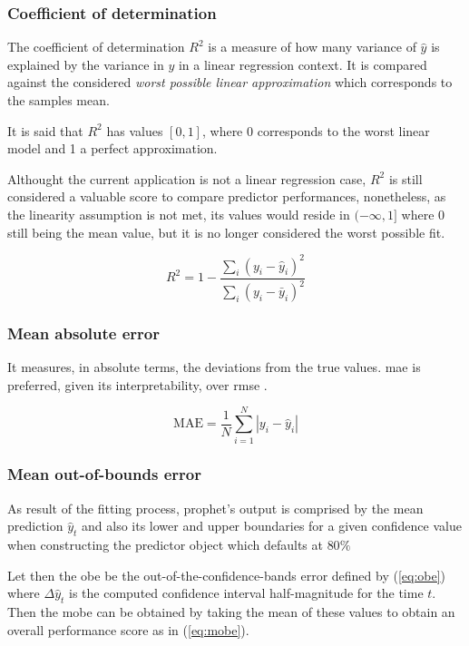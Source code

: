 \subsubsection*{Coefficient of determination}

The coefficient of determination $R^2$ is a measure of how many variance of $\hat{y}$ is explained by the variance in $y$ in a linear regression context. It is compared against the considered \emph{worst possible linear approximation} which corresponds to the samples mean.

It is said that $R^2$ has values $[0,1]$, where $0$ corresponds to the worst linear model and 1 a perfect approximation. 

Althought the current application is not a linear regression case, $R^2$ is still considered a valuable score to compare predictor performances, nonetheless, as the linearity assumption is not met, its values would reside in $(-\infty, 1]$ where 0 still being the mean value, but it is no longer considered the worst possible fit.

\begin{equation}\label{eq:rsq}
R^2 = 1 - \frac{\sum_{i}{(y_i - \hat{y}_i)^2}}{\sum_{i}{(y_i - \bar{y}_i)^2}}
\end{equation}


\subsubsection*{Mean absolute error}

It measures, in absolute terms, the deviations from the true values. \ac{mae} is preferred, given its interpretability, over \ac{rmse} \cite{MAE}.

\begin{equation}\label{eq:mae}
\text{MAE}	= \frac{1}{N} \sum_{i=1}^{N}{ \left| y_i - \hat{y}_i \right| }
\end{equation}


\subsubsection*{Mean out-of-bounds error}

As result of the fitting process, prophet's output is comprised by the mean prediction $\hat{y}_t$ and also its lower and upper boundaries for a given confidence value when constructing the predictor object which defaults at $80\%$ 

Let then the \ac{obe} be the out-of-the-confidence-bands error defined by (\ref{eq:obe}) where $\Delta \hat{y}_t$ is the computed confidence interval half-magnitude for the time $t$. Then the \ac{mobe} can be obtained by taking the mean of these values to obtain an overall performance score as in (\ref{eq:mobe}). 

